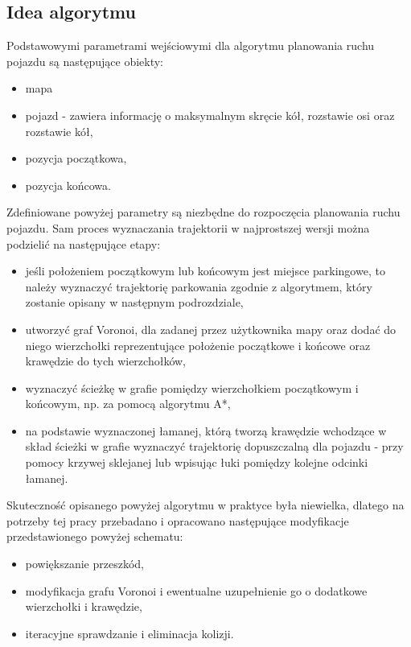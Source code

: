 \documentclass[a4paper,11pt,twoside]{report}
\theoremstyle{definition}
\begin{document}
\subsection{Idea algorytmu}

Podstawowymi parametrami wejściowymi dla algorytmu planowania ruchu pojazdu są następujące obiekty:
\begin{itemize}
	\item mapa
	\item pojazd - zawiera informację o maksymalnym skręcie kół, rozstawie osi oraz rozstawie kół,
	\item pozycja początkowa,
	\item pozycja końcowa.
\end{itemize}

Zdefiniowane powyżej parametry są niezbędne do rozpoczęcia planowania ruchu pojazdu. Sam proces wyznaczania trajektorii w najprostszej wersji można podzielić na następujące etapy:
\begin{itemize}
	\item jeśli położeniem początkowym lub końcowym jest miejsce parkingowe, to należy wyznaczyć trajektorię parkowania zgodnie z algorytmem, który zostanie opisany w następnym podrozdziale,
	\item utworzyć graf Voronoi, dla zadanej przez użytkownika mapy oraz dodać do niego wierzchołki reprezentujące położenie początkowe i końcowe oraz krawędzie do tych wierzchołków,
	\item wyznaczyć ścieżkę w grafie pomiędzy wierzchołkiem początkowym i końcowym, np. za pomocą algorytmu A*,
	\item na podstawie wyznaczonej łamanej, którą tworzą krawędzie wchodzące w skład ścieżki w grafie wyznaczyć trajektorię dopuszczalną dla pojazdu - przy pomocy krzywej sklejanej lub wpisując łuki pomiędzy kolejne odcinki łamanej.
\end{itemize}

Skuteczność opisanego powyżej algorytmu w praktyce była niewielka, dlatego na potrzeby tej pracy przebadano i opracowano następujące modyfikacje przedstawionego powyżej schematu:
\begin{itemize}
	\item powiększanie przeszkód,
	\item modyfikacja grafu Voronoi i ewentualne uzupełnienie go o dodatkowe wierzchołki i krawędzie,
	\item iteracyjne sprawdzanie i eliminacja kolizji.
\end{itemize}
\end{document}
